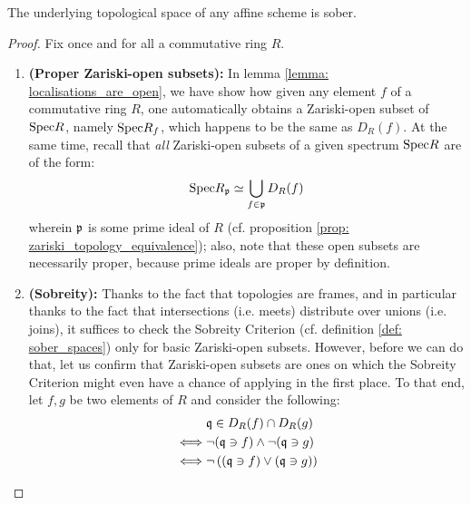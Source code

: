                     \begin{proposition} \label{prop: affine_schemes_are_sober}
                        The underlying topological space of any affine scheme is sober. 
                    \end{proposition}
                        \begin{proof}
                            Fix once and for all a commutative ring $R$. 
                            \begin{enumerate}
                                \item \textbf{(Proper Zariski-open subsets):} In lemma \ref{lemma: localisations_are_open}, we have show how given any element $f$ of a commutative ring $R$, one automatically obtains a Zariski-open subset of $\mathrm{Spec} R$, namely $\mathrm{Spec} R_f$, which happens to be the same as $D_R(f)$. At the same time, recall that \textit{all} Zariski-open subsets of a given spectrum $\mathrm{Spec} R$ are of the form:
                                    $$\mathrm{Spec} R_{\mathfrak{p}} \simeq \bigcup_{f \in \mathfrak{p}} D_R(f)$$
                                wherein $\mathfrak{p}$ is some prime ideal of $R$ (cf. proposition \ref{prop: zariski_topology_equivalence}); also, note that these open subsets are necessarily proper, because prime ideals are proper by definition. 
                                \item \textbf{(Sobreity):} Thanks to the fact that topologies are frames, and in particular thanks to the fact that intersections (i.e. meets) distribute over unions (i.e. joins), it suffices to check the Sobreity Criterion (cf. definition \ref{def: sober_spaces}) only for basic Zariski-open subsets. However, before we can do that, let us confirm that Zariski-open subsets are ones on which the Sobreity Criterion might even have a chance of applying in the first place. To that end, let $f, g$ be two elements of $R$ and consider the following:
                                    $$
                                        \begin{aligned}
                                            & \mathfrak{q} \in D_R(f) \cap D_R(g)
                                            \\
                                            \iff & \neg(\mathfrak{q} \ni f) \wedge \neg(\mathfrak{q} \ni g)
                                            \\
                                            \iff & \neg \left((\mathfrak{q} \ni f) \vee (\mathfrak{q} \ni g)\right)
                                        \end{aligned}
$$
\end{enumerate}
\end{proof}
